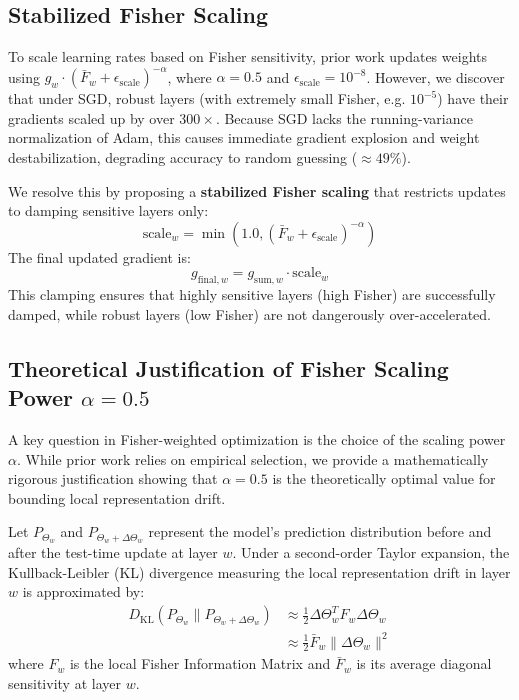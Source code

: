 \documentclass{article}
\theoremstyle{plain}
\theoremstyle{definition}
\theoremstyle{remark}
\begin{document}
\subsection{Stabilized Fisher Scaling}
To scale learning rates based on Fisher sensitivity, prior work \cite{lfwa} updates weights using $g_w \cdot (\bar{F}_w + \epsilon_{\text{scale}})^{-\alpha}$, where $\alpha = 0.5$ and $\epsilon_{\text{scale}} = 10^{-8}$. However, we discover that under SGD, robust layers (with extremely small Fisher, e.g. $10^{-5}$) have their gradients scaled up by over $300\times$. Because SGD lacks the running-variance normalization of Adam, this causes immediate gradient explosion and weight destabilization, degrading accuracy to random guessing ($\approx 49\%$).

We resolve this by proposing a \textbf{stabilized Fisher scaling} that restricts updates to damping sensitive layers only:
\begin{equation}
    \text{scale}_w = \min\left(1.0, (\bar{F}_w + \epsilon_{\text{scale}})^{-\alpha}\right)
\end{equation}
The final updated gradient is:
\begin{equation}
    g_{\text{final}, w} = g_{\text{sum}, w} \cdot \text{scale}_w
\end{equation}
This clamping ensures that highly sensitive layers (high Fisher) are successfully damped, while robust layers (low Fisher) are not dangerously over-accelerated.

\subsection{Theoretical Justification of Fisher Scaling Power $\alpha = 0.5$}
A key question in Fisher-weighted optimization is the choice of the scaling power $\alpha$. While prior work \cite{lfwa} relies on empirical selection, we provide a mathematically rigorous justification showing that $\alpha = 0.5$ is the theoretically optimal value for bounding local representation drift.

Let $P_{\Theta_w}$ and $P_{\Theta_w + \Delta \Theta_w}$ represent the model's prediction distribution before and after the test-time update at layer $w$. Under a second-order Taylor expansion, the Kullback-Leibler (KL) divergence measuring the local representation drift in layer $w$ is approximated by:
\begin{align}
    D_{\text{KL}}(P_{\Theta_w} \parallel P_{\Theta_w + \Delta \Theta_w}) &\approx \frac{1}{2} \Delta \Theta_w^T F_w \Delta \Theta_w \nonumber \\
    &\approx \frac{1}{2} \bar{F}_w \|\Delta \Theta_w\|^2
\end{align}
where $F_w$ is the local Fisher Information Matrix and $\bar{F}_w$ is its average diagonal sensitivity at layer $w$. 
\end{document}
